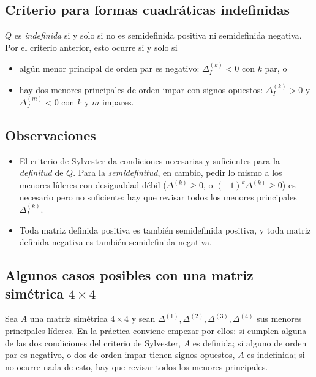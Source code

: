 \documentclass{article}
\begin{document}
\subsection*{Criterio para formas cuadráticas indefinidas}
{\color{teal}\(Q\) es \emph{indefinida} si y solo si no es semidefinida positiva ni semidefinida negativa. Por el criterio anterior, esto ocurre si y solo si
\begin{itemize}
  \item algún menor principal de orden par es negativo: \(\Delta^{(k)}_I<0\) con \(k\) par, o
  \item hay dos menores principales de orden impar con signos opuestos: \(\Delta^{(k)}_I>0\) y \(\Delta^{(m)}_J<0\) con \(k\) y \(m\) impares.
\end{itemize}}


\subsection*{Observaciones}
\begin{itemize}
  \item El criterio de Sylvester da condiciones necesarias y suficientes para la \emph{definitud} de \(Q\). Para la \emph{semidefinitud}, en cambio, pedir lo mismo a los menores líderes con desigualdad débil (\(\Delta^{(k)}\ge0\), o \((-1)^k\Delta^{(k)}\ge0\)) es necesario pero no suficiente: hay que revisar todos los menores principales \(\Delta^{(k)}_I\).
  \item Toda matriz definida positiva es también semidefinida positiva, y toda matriz definida negativa es también semidefinida negativa.
\end{itemize}


\subsection*{Algunos casos posibles con una matriz simétrica \(4\times4\)}
Sea \(A\) una matriz simétrica \(4\times4\) y sean \(\Delta^{(1)},\Delta^{(2)},\Delta^{(3)},\Delta^{(4)}\) sus menores principales líderes. En la práctica conviene empezar por ellos: si cumplen alguna de las dos condiciones del criterio de Sylvester, \(A\) es definida; si alguno de orden par es negativo, o dos de orden impar tienen signos opuestos, \(A\) es indefinida; si no ocurre nada de esto, hay que revisar todos los menores principales.
\end{document}
